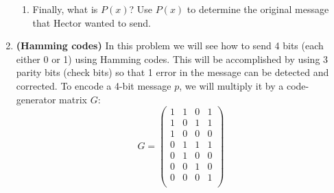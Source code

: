 \documentclass[11pt]{article}
\newif\ifsolutions
\begin{document}
\begin{enumerate}
\begin{enumerate}
\item Finally, what is $P(x)$? Use $P(x)$ to determine the original message that Hector wanted to send.
\newpage
\end{enumerate}

%
%


\ifsolutions 
\textbf{Solutions:} \fi



\item {\bf (Hamming codes)} In this problem we will see how to send 4 bits (each either 0 or 1) using Hamming codes. This will be accomplished by using 3 parity bits (check bits) so that 1 error in the message can be detected and corrected. To encode a 4-bit message $p$, we will multiply it by a code-generator matrix $G$:
\[ G = \left( \begin{array}{cccc} 1 & 1 & 0 & 1 \\
1 & 0 & 1 & 1 \\
1 & 0 & 0 & 0 \\
0 & 1 & 1 & 1 \\
0 & 1 & 0 & 0 \\
0 & 0 & 1 & 0 \\
0 & 0 & 0 & 1 \\
\end{array} \right)
\]   


\end{enumerate}
\end{document}
